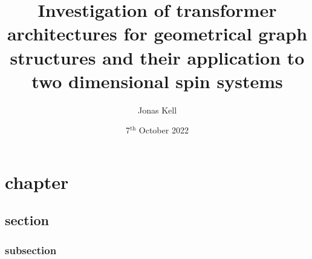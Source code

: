\documentclass[
headings=optiontohead,              %
12pt,                               %
DIV=13,                             %
twoside=false,                      %
open=right,                         %
BCOR=10mm,                          %
toc=bibliographynumbered            %
]{scrreport}
\title{Investigation of transformer architectures for geometrical graph structures and their application to two dimensional spin systems}
\author{Jonas Kell}
\date{7$^\text{th}$ October 2022}
\begin{document}
\thispagestyle{empty}                           %
\cleardoublepage                                %
\pagestyle{scrheadings}                         %
\renewcommand{\contentsname}{Table of Contents} %
\tableofcontents                                %
\cleardoublepage                                %

\clearpairofpagestyles
\ihead{\leftmark}
\ohead{\Ifstr{\leftmark}{\rightmark}{}{\rightmark}}
\cfoot*{\pagemark}


\chapter{chapter}
    \section{section}
        \subsection{subsection}
            
            \FloatBarrier
\Blinddocument



\end{document}
